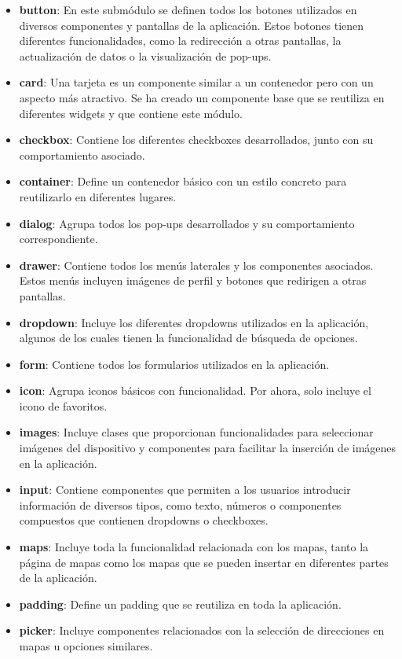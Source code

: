 \documentclass[a4paper, 12pt]{article}
\begin{document}
\begin{itemize}[noitemsep]
	\item \textbf{button}: En este submódulo se definen todos los botones utilizados en diversos componentes y pantallas de la aplicación. Estos botones tienen diferentes funcionalidades, como la redirección a otras pantallas, la actualización de datos o la visualización de pop-ups.
	\item \textbf{card}: Una tarjeta es un componente similar a un contenedor pero con un aspecto más atractivo. Se ha creado un componente base que se reutiliza en diferentes widgets y que contiene este módulo.
	\item \textbf{checkbox}: Contiene los diferentes checkboxes desarrollados, junto con su comportamiento asociado.
	\item \textbf{container}: Define un contenedor básico con un estilo concreto para reutilizarlo en diferentes lugares.
	\item \textbf{dialog}: Agrupa todos los pop-ups desarrollados y su comportamiento correspondiente.
	\item \textbf{drawer}: Contiene todos los menús laterales y los componentes asociados. Estos menús incluyen imágenes de perfil y botones que redirigen a otras pantallas.
	\item \textbf{dropdown}: Incluye los diferentes dropdowns utilizados en la aplicación, algunos de los cuales tienen la funcionalidad de búsqueda de opciones.
	\item \textbf{form}: Contiene todos los formularios utilizados en la aplicación.
	\item \textbf{icon}: Agrupa iconos básicos con funcionalidad. Por ahora, solo incluye el icono de favoritos.
	\item \textbf{images}: Incluye clases que proporcionan funcionalidades para seleccionar imágenes del dispositivo y componentes para facilitar la inserción de imágenes en la aplicación.
	\item \textbf{input}: Contiene componentes que permiten a los usuarios introducir información de diversos tipos, como texto, números o componentes compuestos que contienen dropdowns o checkboxes.
	\item \textbf{maps}: Incluye toda la funcionalidad relacionada con los mapas, tanto la página de mapas como los mapas que se pueden insertar en diferentes partes de la aplicación.
	\item \textbf{padding}: Define un padding que se reutiliza en toda la aplicación.
	\item \textbf{picker}: Incluye componentes relacionados con la selección de direcciones en mapas u opciones similares.

\end{itemize}
\end{document}
